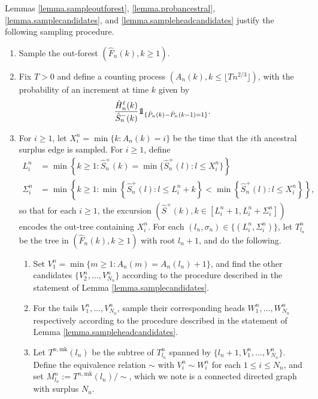 Lemmas \ref{lemma.sampleoutforest}, \ref{lemma.probancestral}, \ref{lemma.samplecandidates}, and \ref{lemma.sampleheadcandidates} justify the following sampling procedure.
\begin{enumerate}
    \item Sample the out-forest $(\hat{F}_n(k),k\geq 1)$.
    \item Fix $T>0$ and define a counting process $(A_n(k),k\leq \lfloor Tn^{2/3}\rfloor)$, with the probability of an increment at time $k$ given by $$\frac{\hat{H}_n^\ell(k)}{\hat{S}_n^-(k)}\one_{\{\hat{P}_n(k)-\hat{P}_n(k-1)=1\}}.$$
    \item For $i\geq 1$, let $X_i^n=\min\{k:A_n(k)=i\}$ be the time that the $i$th ancestral surplus edge is sampled. For $i\geq 1$, define
\begin{align*}L_i^n&=\min\left\{k\geq 1:\hat{S}^{+}_n(k)=\min\{\hat{S}^{+}_n(l):l\leq X_i^n\}\right\}\\
\Sigma_i^n&=\min\left\{k \geq 1: \min\left\{\hat{S}^{+}_n(l):l\leq L_i^n+k\right\} < \min\left\{\hat{S}^{+}_n(l):l\leq X_i^n\right\}\right\},
\end{align*}
so that for each $i\geq 1$, the excursion $\left(\hat{S}^+(k),k\in [L_i^n+1,L_i^n+\Sigma_i^n]\right)$ encodes the out-tree containing $X_i^n$. For each $(l_n,\sigma_n)\in \{(L_i^n,\Sigma_i^n)\}$, let $T^n_{l_n}$ be the tree in $(\hat{F}_n(k),k\geq 1)$ with root $l_n+1$, and do the following.
    \begin{enumerate}
    \item \label{item.procedure3} Set $V_1^n=\min\{m\geq 1:A_n(m)=A_n(l_n)+1\}$, and find the other candidates $\{V_2^n,\dots ,V_{N_n}^n\}$ according to the procedure described in the statement of Lemma \ref{lemma.samplecandidates}.
    \item \label{item.procedure4} For the tails $V_1^n,\dots, V_{N_n}^n$, sample their corresponding heads $W_1^n,\dots ,W_{N_n}^n$ respectively according to the procedure described in the statement of Lemma \ref{lemma.sampleheadcandidates}.
    \item Let $T^{n,\mathrm{mk}}(l_n)$ be the subtree of $T^n_{l_n}$ spanned by $\{l_n+1,V_1^n,\dots ,V_{N_n}^n\}$. Define the equivalence relation $\sim$ with $V_i^n\sim W_i^n$ for each $1\leq i\leq N_n$, and set $M^n_{l_n}:=T^{n,\mathrm{mk}}(l_n)/\sim$, which we note is a connected directed graph with surplus $N_n$. 
\end{enumerate}
\end{enumerate}
